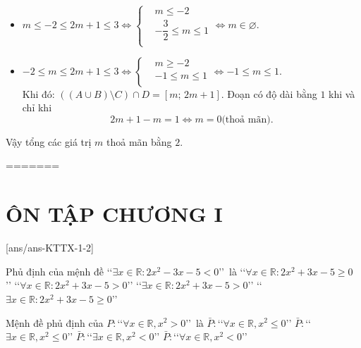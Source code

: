 \begin{ex}
{\begin{enumerate}[+)]
\begin{itemize}
Đoạn có độ dài bằng $1$ khi và chỉ khi \[3-m=1\Leftrightarrow m=2 \text{(thoả mãn)}.\]
\item $m\le -2\le 2m+1\le 3\Leftrightarrow \left\{ \begin{aligned}
& m\le -2 \\
& -\dfrac{3}{2}\le m\le 1 \\
\end{aligned} \right.\Leftrightarrow m\in \varnothing $.
\item $-2\le m\le 2m+1\le 3\Leftrightarrow \left\{ \begin{aligned}
& m\ge -2 \\
& -1\le m\le 1 \\
\end{aligned} \right.\Leftrightarrow -1\le m\le 1$.\\
Khi đó: $\left( \left( A\cup B \right)\setminus C \right)\cap D=\left[ m;\,2m+1 \right]$.
Đoạn có độ dài bằng $1$ khi và chỉ khi \[2m+1-m=1\Leftrightarrow m=0 \text{(thoả mãn)}.\]
\end{itemize}
\end{enumerate}
Vậy tổng các giá trị $m$ thoả mãn bằng $2$.}
\end{ex}
=======
﻿\section*{ÔN TẬP CHƯƠNG I}
\setcounter{ex}{0}\setcounter{bt}{0}
[ans/ans-KTTX-1-2]

\begin{ex}%
Phủ định của mệnh đề \lq\lq  $\exists x\in \mathbb{R}:2x^2-3x-5<0$\rq\rq\  là
\choice
{ \True \lq\lq  $\forall x\in \mathbb{R}:2x^2+3x-5\ge 0$ \rq\rq }
{\lq\lq  $\forall x\in \mathbb{R}:2x^2+3x-5>0$\rq\rq }
{\lq\lq  $\exists x\in \mathbb{R}:2x^2+3x-5>0$\rq\rq}
{ \lq\lq $\exists x\in \mathbb{R}:2x^2+3x-5\ge 0$\rq\rq }
\end{ex}

\begin{ex}%
Mệnh đề phủ định của $P\colon$\lq\lq $\forall x \in \mathbb{R}, x^{2}>0$\rq\rq\,  là
\choice
{$\bar{P}\colon$\lq\lq $\forall x \in \mathbb{R}, x^{2} \leq 0$\rq\rq}
{\True $\bar{P}\colon$\lq\lq $\exists x \in \mathbb{R}, x^{2} \leq 0$\rq\rq}
{$\bar{P}\colon$\lq\lq $\exists x \in \mathbb{R}, x^{2}< 0$\rq\rq}
{$\bar{P}\colon$\lq\lq $\forall x \in \mathbb{R}, x^{2}< 0$\rq\rq}
\end{ex}

